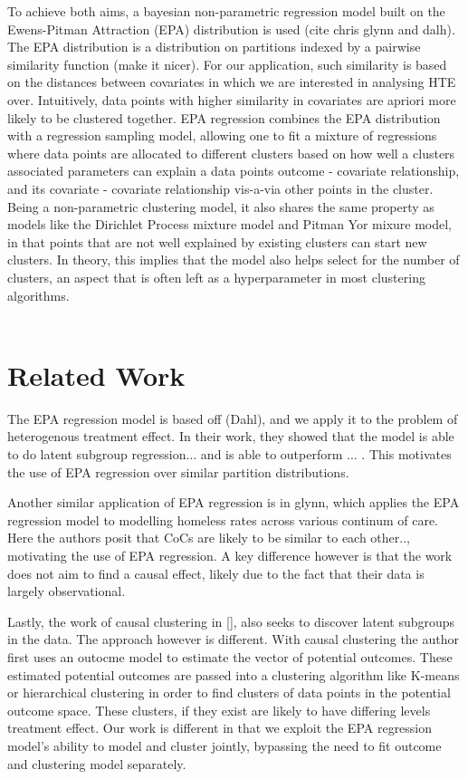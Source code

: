 \documentclass{article}
\begin{document}
To achieve both aims, a bayesian non-parametric regression model built on the Ewens-Pitman Attraction (EPA) distribution is used (cite chris glynn and dalh). The EPA distribution is a distribution on partitions indexed by a pairwise similarity function (make it nicer). For our application, such similarity is based on the distances between covariates in which we are interested in analysing HTE over. Intuitively, data points with higher similarity in covariates are apriori more likely to be clustered together. EPA regression combines the EPA distribution with a regression sampling model, allowing one to fit a mixture of regressions where data points are allocated to different clusters based on how well a clusters associated parameters can explain a data points outcome - covariate relationship, and its covariate - covariate relationship vis-a-via other points in the cluster. Being a non-parametric clustering model, it also shares the same property as models like the Dirichlet Process mixture model and Pitman Yor mixure model, in that points that are not well explained by existing clusters can start new clusters. In theory, this implies that the model also helps select for the number of clusters, an aspect that is often left as a hyperparameter in most clustering algorithms.
\\ \\ 
\section{Related Work}

The EPA regression model is based off (Dahl), and we apply it to the problem of heterogenous treatment effect. In their work, they showed that the model is able to do latent subgroup regression... and is able to outperform ... . This motivates the use of EPA regression over similar partition distributions. 

Another similar application of EPA regression is in glynn, which applies the EPA regression model to modelling homeless rates across various continum of care. Here the authors posit that CoCs are likely to be similar to each other.., motivating the use of EPA regression. A key difference however is that the work does not aim to find a causal effect, likely due to the fact that their data is largely observational. 

Lastly, the work of causal clustering in [], also seeks to discover latent subgroups in the data. The approach however is different. With causal clustering the author first uses an outocme model to estimate the vector of potential outcomes. These estimated potential outcomes are passed into a clustering algorithm like K-means or hierarchical clustering in order to find clusters of data points in the potential outcome space. These clusters, if they exist are likely to have differing levels treatment effect. Our work is different in that we exploit the EPA regression model's ability to model and cluster jointly, bypassing the need to fit outcome and clustering model separately. 
\end{document}
